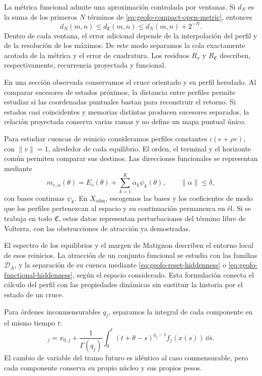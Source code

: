 La métrica funcional admite una aproximación controlada por ventanas. Si
\(d_N\) es la suma de los primeros \(N\) términos de
\cref{eq:geofo-compact-open-metric}, entonces
\[
 d_N(m,n)\le d_{\mathfrak C}(m,n)\le d_N(m,n)+2^{-N}.
\]
Dentro de cada ventana, el error adicional depende de la interpolación del
perfil y de la resolución de los máximos. De este modo separamos la cola
exactamente acotada de la métrica y el error de cuadratura. Los residuos
\(R_x\) y \(R_{\mathfrak C}\) describen, respectivamente, recurrencia
proyectada y funcional.

En una sección observada conservamos el cruce orientado y su perfil
heredado. Al comparar sucesores de estados próximos, la distancia entre
perfiles permite estudiar si las coordenadas puntuales bastan para
reconstruir el retorno. Si estados casi coincidentes y memorias distintas
producen sucesores separados, la relación proyectada conserva varias ramas
y no define un mapa puntual único.

Para estudiar cuencas de reinicio consideramos perfiles constantes
\(\iota(e+\rho v)\), con \(\|v\|=1\), alrededor de cada equilibrio.
El orden, el terminal y el horizonte común permiten comparar sus destinos.
Las direcciones funcionales se representan mediante
\begin{equation}
 m_{e,\alpha}(\theta)=E_e(\theta)+
 \sum_{k=1}^{K}\alpha_k\psi_k(\theta),\qquad \|\alpha\|\le\delta,
 \label{eq:geofo-history-probes}
\end{equation}
con bases continuas \(\psi_k\). En \(X_{\mathrm{adm}}\), escogemos las
bases y los coeficientes de modo que los perfiles pertenezcan al espacio y
su continuación permanezca en él. Si se trabaja en todo \(\mathfrak C\),
estos datos representan perturbaciones del término libre de Volterra, con
las obstrucciones de atracción ya demostradas.

El espectro de los equilibrios y el margen de Matignon describen el entorno
local de esos reinicios. La atracción de un conjunto funcional se estudia
con las familias \(\mathcal D_A\), y la separación de su cuenca mediante
\cref{eq:geofo-reset-hiddenness} o
\cref{eq:geofo-functional-hiddenness}, según el espacio considerado.
Esta formulación conecta el cálculo del perfil con las propiedades
dinámicas sin sustituir la historia por el estado de un cruce.

Para órdenes inconmensurables \(q_j\), separamos la integral de cada
componente en el mismo tiempo \(t\):
\begin{equation}
 [m_t(\theta)]_j=x_{0,j}+\frac1{\Gamma(q_j)}
 \int_0^t(t+\theta-s)^{q_j-1}f_j(x(s))\,\dd s.
 \label{eq:geofo-incommensurate-profile}
\end{equation}
El cambio de variable del tramo futuro es idéntico al caso conmensurable,
pero cada componente conserva su propio núcleo y sus propios pesos.


